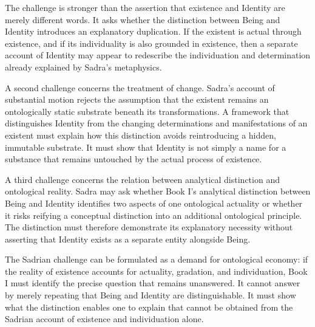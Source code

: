 \label{para:VS.B01.P01.C08.S17.SS15.P002}

The challenge is stronger
than the assertion that
existence and Identity
are merely different words.
It asks whether the
distinction between Being
and Identity introduces
an explanatory duplication.
If the existent is actual
through existence, and
if its individuality is
also grounded in existence,
then a separate account
of Identity may appear
to redescribe the
individuation and
determination already
explained by Sadra's
metaphysics.

\label{para:VS.B01.P01.C08.S17.SS15.P003}

A second challenge concerns
the treatment of change.
Sadra's account of
substantial motion rejects
the assumption that the
existent remains an
ontologically static
substrate beneath its
transformations. A
framework that distinguishes
Identity from the
changing determinations
and manifestations of
an existent must explain
how this distinction
avoids reintroducing
a hidden, immutable
substrate. It must
show that Identity is
not simply a name for
a substance that remains
untouched by the actual
process of existence.

\label{para:VS.B01.P01.C08.S17.SS15.P004}

A third challenge concerns
the relation between
analytical distinction
and ontological reality.
Sadra may ask whether
Book I's analytical
distinction between Being
and Identity identifies
two aspects of one
ontological actuality
or whether it risks
reifying a conceptual
distinction into an
additional ontological
principle. The distinction
must therefore demonstrate
its explanatory necessity
without asserting that
Identity exists as
a separate entity
alongside Being.

\label{para:VS.B01.P01.C08.S17.SS15.P005}

The Sadrian challenge
can be formulated as
a demand for ontological
economy: if the reality
of existence accounts
for actuality, gradation,
and individuation, Book I
must identify the precise
question that remains
unanswered. It cannot
answer by merely repeating
that Being and Identity
are distinguishable.
It must show what
the distinction enables
one to explain that
cannot be obtained
from the Sadrian account
of existence and
individuation alone.

